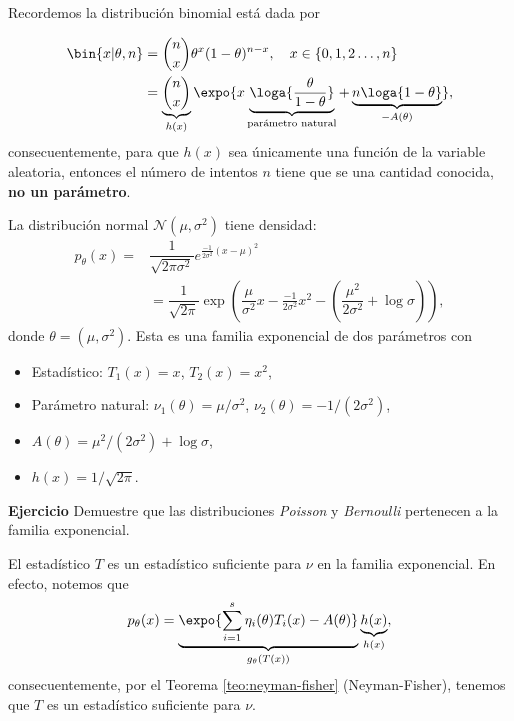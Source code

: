 \begin{example}
Recordemos la distribución binomial está dada por 

\begin{align*}
	\bin{x|\theta,n} 	&=\binom{n}{x}\theta^x(1-\theta)^{n-x},\quad x\in\{0,1,2\ldots,n\}\\
					&=
					\underbrace{\binom{n}{x}}_{h(x)}\expo{x\underbrace{\loga{\frac{\theta}{1-\theta}}}_{\text{parámetro natural}} + \underbrace{n\loga{1-\theta}}_{-{A(\theta)}}},
\end{align*}
consecuentemente, para que $h(x)$ sea únicamente una función de la variable aleatoria, entonces el número de intentos $n$ tiene que se una cantidad conocida, \textbf{no un parámetro}. 	
 \end{example} 

\begin{example} 
La distribución normal $\mathcal{N}(\mu,\sigma^{2})$ tiene densidad:
\begin{align}
    p_{\theta}(x) = &  \dfrac{1}{\sqrt{2\pi \sigma^{2}}} e^{\frac{-1}{2\sigma^{2}}(x-\mu)^{2}}\\
    & = \dfrac{1}{\sqrt{2\pi}}\exp\left(\dfrac{\mu}{\sigma^{2}}x -\frac{-1}{2\sigma^{2}}x^{2} - \left(\dfrac{\mu^{2}}{2\sigma^{2}} + \log \sigma \right)\right),
\end{align}
donde $\theta = (\mu, \sigma^{2})$. Esta es una familia exponencial de dos parámetros con
\begin{itemize}
    \item Estadístico: $T_{1}(x) = x$, $T_{2} (x) = x^2$,
    \item Parámetro natural: $\nu_{1}(\theta) = \mu/\sigma^{2}$, $\nu_{2}(\theta) = -1/(2\sigma^{2})$,
    \item $A(\theta) = \mu^{2}/(2\sigma^{2}) + \log \sigma $,
    \item $h(x) = 1/\sqrt{2\pi}$.
\end{itemize}  

\end{example}

\begin{example} \textbf{Ejercicio} Demuestre que las distribuciones \emph{Poisson} y \emph{Bernoulli} pertenecen a la familia exponencial. 

\end{example}

\begin{remark}
 El estadístico $T$ es un estadístico suficiente para $\nu$ en la familia exponencial. En efecto, notemos que 
 \begin{equation}
	\label{eq:densidadexponencial2}
 	p_\theta(x) = \underbrace{\expo{\sum_{i=1}^s\eta_i(\theta)T_i(x)-A(\theta)}}_{g_\theta(T(x))}\underbrace{h(x)}_{h(x)},
 \end{equation} 
consecuentemente, por el Teorema  \ref{teo:neyman-fisher} (Neyman-Fisher), tenemos que $T$ es un estadístico suficiente para $\nu$.
\end{remark}

